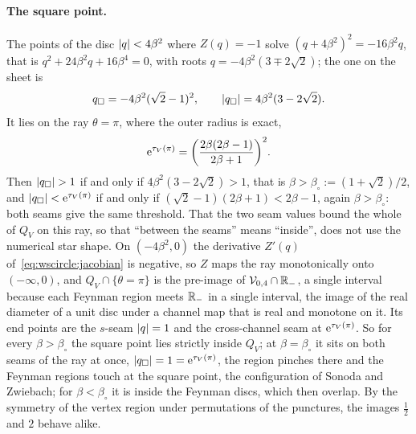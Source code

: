 \paragraph{The square point.}
The points of the disc ${|q|} < 4 \beta^2$ where $Z(q) = - 1$ solve $(q + 4 \beta^2)^2 = - 16 \beta^2 q$, that is $q^2 + 24 \beta^2 q + 16 \beta^4 = 0$, with roots $q = - 4 \beta^2 (3 \mp 2 \sqrt 2)$; the one on the sheet is
\begin{equation}
  \label{eq:wscircle:square-point}
  q_\square
    = - 4 \beta^2 (\sqrt 2 - 1)^2,
  \qquad
  {|q_\square|}
    = 4 \beta^2 (3 - 2 \sqrt 2).
\end{equation}
It lies on the ray $\theta = \pi$, where the outer radius is exact,
\begin{equation}
  \mathrm{e}^{\tau_V(\pi)}
    = \bigg( \frac{2 \beta (2 \beta - 1)}{2 \beta + 1} \bigg)^2.
\end{equation}
Then ${|q_\square|} > 1$ if and only if $4 \beta^2 (3 - 2 \sqrt 2) > 1$, that is $\beta > \beta_\circ := (1 + \sqrt 2) / 2$, and ${|q_\square|} < \mathrm{e}^{\tau_V(\pi)}$ if and only if $(\sqrt 2 - 1)(2 \beta + 1) < 2 \beta - 1$, again $\beta > \beta_\circ$: both seams give the same threshold.
That the two seam values bound the whole of $Q_V$ on this ray, so that ``between the seams'' means ``inside'', does not use the numerical star shape.
On $(- 4 \beta^2, 0)$ the derivative $Z'(q)$ of~\eqref{eq:wscircle:jacobian} is negative, so $Z$ maps the ray monotonically onto $(- \infty, 0)$, and $Q_V \cap \{ \theta = \pi \}$ is the pre-image of $\mathcal V_{0,4} \cap \mathbb{R}_-$, a single interval because each Feynman region meets $\mathbb{R}_-$ in a single interval, the image of the real diameter of a unit disc under a channel map that is real and monotone on it.
Its end points are the $s$-seam ${|q|} = 1$ and the cross-channel seam at $\mathrm{e}^{\tau_V(\pi)}$.
So for every $\beta > \beta_\circ$ the square point lies strictly inside $Q_V$; at $\beta = \beta_\circ$ it sits on both seams of the ray at once, ${|q_\square|} = 1 = \mathrm{e}^{\tau_V(\pi)}$, the region pinches there and the Feynman regions touch at the square point, the configuration of Sonoda and Zwiebach; for $\beta < \beta_\circ$ it is inside the Feynman discs, which then overlap.
By the symmetry of the vertex region under permutations of the punctures, the images $\tfrac{1}{2}$ and $2$ behave alike.

